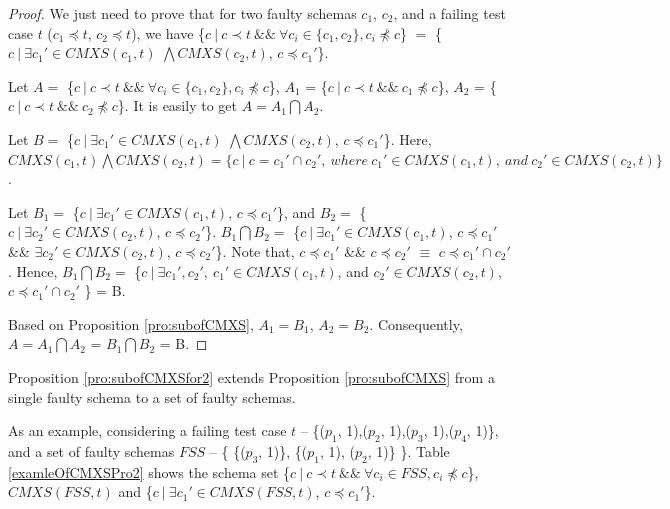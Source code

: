 \begin{proof}

We just need to prove that for two faulty schemas $c_{1}$, $c_{2}$, and a failing test case $t$ ($c_{1} \preceq t$, $c_{2} \preceq t$), we have \{$c\ |\ c \prec t\ \&\&\ \forall c_{i} \in \{c_{1}, c_{2}\}, c_{i} \npreceq c $\} $=$  \{$ c\ |\ \exists c_{1}' \in CMXS(c_{1}, t)$ $\bigwedge CMXS(c_{2}, t)$, $c \preceq c_{1}'$\}.

Let $A = $ \{$c\ |\ c \prec t\ \&\&\ \forall c_{i} \in \{c_{1}, c_{2}\}, c_{i} \npreceq c $\}, $A_{1}$ = \{$c\ |\ c \prec t\ \&\&\  c_{1} \npreceq c $\}, $A_{2}$ = \{$c\ |\ c \prec t\ \&\&\  c_{2} \npreceq c $\}. It is easily to get $A = A_{1} \bigcap A_{2}$.

Let $B = $ \{$ c\ |\ \exists c_{1}' \in CMXS(c_{1}, t)$ $\bigwedge CMXS(c_{2}, t)$, $c \preceq c_{1}'$\}. Here,  $ CMXS(c_{1}, t) \bigwedge CMXS(c_{2}, t) = \{ c\ |\ c = c_{1}' \cap c_{2}',\ where\ c_{1}' \in CMXS(c_{1}, t),\ and\ c_{2}' \in CMXS(c_{2}, t) \}$.

Let $B_{1} = $ \{$ c\ |\ \exists c_{1}' \in CMXS(c_{1}, t)$, $c \preceq c_{1}'$\}, and $B_{2} = $ \{$ c\ |\ \exists c_{2}' \in CMXS(c_{2}, t)$, $c \preceq c_{2}'$\}. $B_{1} \bigcap B_{2} = $ \{$ c\ |\ \exists c_{1}' \in CMXS(c_{1}, t)$, $c \preceq c_{1}'$ \&\& $\exists c_{2}' \in CMXS(c_{2}, t)$, $c \preceq c_{2}'$\}. Note that, $c \preceq c_{1}'$ \&\& $c \preceq c_{2}'$ $\equiv$ $c \preceq c_{1}' \cap c_{2}'$. Hence, $B_{1} \bigcap B_{2} = $ \{$ c\ |\ \exists c_{1}', c_{2}',\  c_{1}' \in CMXS(c_{1}, t)$, and $c_{2}' \in CMXS(c_{2}, t)$, $c \preceq c_{1}' \cap c_{2}'$ \} = B.

Based on Proposition \ref{pro:subofCMXS}, $A_{1} = B_{1}$, $A_{2} = B_{2}$. Consequently,
$A = A_{1} \bigcap A_{2}$ = $B_{1} \bigcap B_{2}$  = B.

\end{proof}

Proposition \ref{pro:subofCMXSfor2} extends Proposition \ref{pro:subofCMXS} from a single faulty schema to a set of faulty schemas.

As an example, considering a failing test case $t$ -- \{($p_{1}$, 1),($p_{2}$, 1),($p_{3}$, 1),($p_{4}$, 1)\}, and a set of faulty schemas  $FSS$ -- \{ \{($p_{3}$, 1)\},  \{($p_{1}$, 1), ($p_{2}$, 1)\} \}. Table \ref{examleOfCMXSPro2} shows the schema set \{$c\ |\ c \prec t\ \&\&\ \forall c_{i} \in FSS, c_{i} \npreceq c $\}, $CMXS(FSS, t)$ and \{$ c\ |\ \exists c_{1}' \in CMXS(FSS, t)$, $c \preceq c_{1}'$\}.


